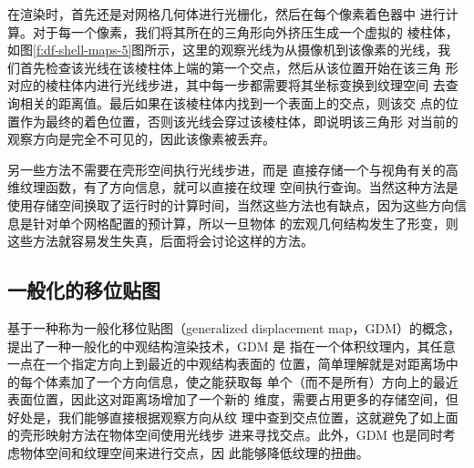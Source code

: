 在渲染时，首先还是对网格几何体进行光栅化，然后在每个像素着色器中 进行计算。对于每一个像素，我们将其所在的三角形向外挤压生成一个虚拟的 棱柱体，如图\ref{f:df-shell-maps-5}图所示，这里的观察光线为从摄像机到该像素的光线，我 们首先检查该光线在该棱柱体上端的第一个交点，然后从该位置开始在该三角 形对应的棱柱体内进行光线步进，其中每一步都需要将其坐标变换到纹理空间 去查询相关的距离值。最后如果在该棱柱体内找到一个表面上的交点，则该交 点的位置作为最终的着色位置，否则该光线会穿过该棱柱体，即说明该三角形 对当前的观察方向是完全不可见的，因此该像素被丢弃。

另一些方法不需要在壳形空间执行光线步进，而是 直接存储一个与视角有关的高维纹理函数，有了方向信息，就可以直接在纹理 空间执行查询。当然这种方法是使用存储空间换取了运行时的计算时间，当然这些方法也有缺点，因为这些方向信息是针对单个网格配置的预计算，所以一旦物体 的宏观几何结构发生了形变，则这些方法就容易发生失真，后面将会讨论这样的方法。



\subsection{一般化的移位贴图}
\cite{a:GeneralizedDisplacementMaps} 基于一种称为一般化移位贴图（generalized displacement map，GDM）的概念，提出了一种一般化的中观结构渲染技术，GDM 是 指在一个体积纹理内，其任意一点在一个指定方向上到最近的中观结构表面的 位置，简单理解就是对距离场中的每个体素加了一个方向信息，使之能获取每 单个（而不是所有）方向上的最近表面位置，因此这对距离场增加了一个新的 维度，需要占用更多的存储空间，但好处是，我们能够直接根据观察方向从纹 理中查到交点位置，这就避免了如上面的壳形映射方法在物体空间使用光线步 进来寻找交点。此外，GDM 也是同时考虑物体空间和纹理空间来进行交点，因 此能够降低纹理的扭曲。

